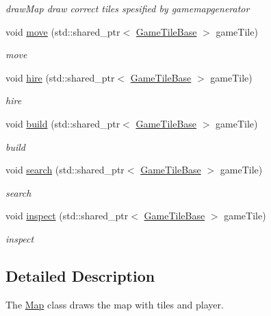 \begin{DoxyCompactItemize}
\begin{DoxyCompactList}\small\item\em draw\-Map draw correct tiles spesified by gamemapgenerator \end{DoxyCompactList}\item 
void \hyperlink{class_game_1_1_map_a94213a3927088efe42d57c746feb319b}{move} (std\-::shared\-\_\-ptr$<$ \hyperlink{class_game_1_1_game_tile_base}{Game\-Tile\-Base} $>$ game\-Tile)
\begin{DoxyCompactList}\small\item\em move \end{DoxyCompactList}\item 
void \hyperlink{class_game_1_1_map_a49051ab00e2e5e4d0c8be5f56af39d43}{hire} (std\-::shared\-\_\-ptr$<$ \hyperlink{class_game_1_1_game_tile_base}{Game\-Tile\-Base} $>$ game\-Tile)
\begin{DoxyCompactList}\small\item\em hire \end{DoxyCompactList}\item 
void \hyperlink{class_game_1_1_map_a3e4b9485c9e1298b630e7aa82facb8bc}{build} (std\-::shared\-\_\-ptr$<$ \hyperlink{class_game_1_1_game_tile_base}{Game\-Tile\-Base} $>$ game\-Tile)
\begin{DoxyCompactList}\small\item\em build \end{DoxyCompactList}\item 
void \hyperlink{class_game_1_1_map_ab66fc12a68048a3ddfb8a49316224ded}{search} (std\-::shared\-\_\-ptr$<$ \hyperlink{class_game_1_1_game_tile_base}{Game\-Tile\-Base} $>$ game\-Tile)
\begin{DoxyCompactList}\small\item\em search \end{DoxyCompactList}\item 
void \hyperlink{class_game_1_1_map_ad91ccc0d5e244a66c6f37d0075f6be6d}{inspect} (std\-::shared\-\_\-ptr$<$ \hyperlink{class_game_1_1_game_tile_base}{Game\-Tile\-Base} $>$ game\-Tile)
\begin{DoxyCompactList}\small\item\em inspect \end{DoxyCompactList}\end{DoxyCompactItemize}


\subsection{Detailed Description}
The \hyperlink{class_game_1_1_map}{Map} class draws the map with tiles and player. 

